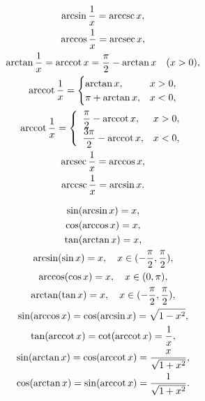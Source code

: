 \begin{theorem}[倒数关系]
\begin{gather}
	\arcsin\frac{1}{x} = \arccsc x, \\
	\arccos\frac{1}{x} = \arcsec x, \\
	\arctan\frac{1}{x} = \arccot x
		= \frac{\pi}{2} - \arctan x
	\quad(x>0), \\
	\arccot\frac{1}{x} = \begin{cases}
		\arctan x, & x>0, \\
		\pi+\arctan x, & x<0,
		\end{cases} \\
	\arccot\frac{1}{x} = \left\{ \def\arraystretch{1.5} \begin{array}{lc}
		\dfrac{\pi}{2} - \arccot x, & x>0, \\
		\dfrac{3\pi}{2} - \arccot x, & x<0,
		\end{array} \right. \\
	\arcsec\frac{1}{x} = \arccos x, \\
	\arccsc\frac{1}{x} = \arcsin x.
\end{gather}
\end{theorem}

\begin{theorem}[三角关系]
\begin{gather}
	\sin(\arcsin{x}) = x, \\
	\cos(\arccos{x}) = x, \\
	\tan(\arctan{x}) = x, \\
	\arcsin(\sin x) = x, \quad x \in (-\frac{\pi}{2},\frac{\pi}{2}), \\
	\arccos(\cos x) = x, \quad x \in (0,\pi), \\
	\arctan(\tan x) = x, \quad x \in (-\frac{\pi}{2},\frac{\pi}{2}), \\
	\sin(\arccos{x}) = \cos(\arcsin{x}) = \sqrt{1 - x^2}, \\
	\tan(\arccot{x}) = \cot(\arccot{x}) = \frac{1}{x}, \\
	\sin(\arctan{x}) = \cos(\arccot{x}) = \frac{x}{\sqrt{1+x^2}}, \\
	\cos(\arctan{x}) = \sin(\arccot{x}) = \frac{1}{\sqrt{1+x^2}}.
\end{gather}
\end{theorem}

